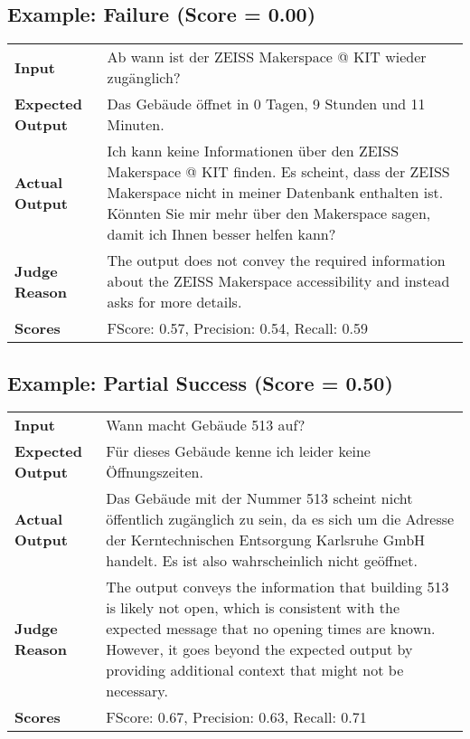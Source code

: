 \documentclass{article}
\begin{document}
\subsection*{Example: Failure (Score = 0.00)}
\begin{longtable}{p{} p{}}
\textbf{Input} & Ab wann ist der ZEISS Makerspace @ KIT wieder zugänglich? \\
\textbf{Expected Output} & Das Gebäude öffnet in 0 Tagen, 9 Stunden und 11 Minuten. \\
\textbf{Actual Output} & Ich kann keine Informationen über den ZEISS Makerspace @ KIT finden. Es scheint, dass der ZEISS Makerspace nicht in meiner Datenbank enthalten ist. Könnten Sie mir mehr über den Makerspace sagen, damit ich Ihnen besser helfen kann? \\
\textbf{Judge Reason} & The output does not convey the required information about the ZEISS Makerspace accessibility and instead asks for more details. \\
\textbf{Scores} & FScore: 0.57, Precision: 0.54, Recall: 0.59 \\
\end{longtable}
\subsection*{Example: Partial Success (Score = 0.50)}
\begin{longtable}{p{} p{}}
\textbf{Input} & Wann macht Gebäude 513 auf? \\
\textbf{Expected Output} & Für dieses Gebäude kenne ich leider keine Öffnungszeiten. \\
\textbf{Actual Output} & Das Gebäude mit der Nummer 513 scheint nicht öffentlich zugänglich zu sein, da es sich um die Adresse der Kerntechnischen Entsorgung Karlsruhe GmbH handelt. Es ist also wahrscheinlich nicht geöffnet. \\
\textbf{Judge Reason} & The output conveys the information that building 513 is likely not open, which is consistent with the expected message that no opening times are known. However, it goes beyond the expected output by providing additional context that might not be necessary. \\
\textbf{Scores} & FScore: 0.67, Precision: 0.63, Recall: 0.71 \\
\end{longtable}
\end{document}
